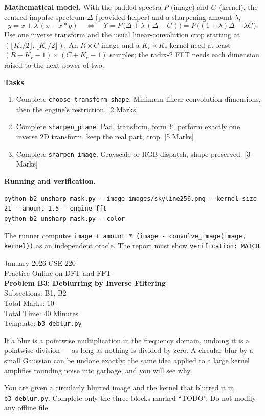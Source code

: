 \documentclass[11pt]{article}
\newcommand{\file}[1]{\texttt{#1}}
\newcommand{\code}[1]{\texttt{#1}}
\newcommand{\problemheader}[3]{%
  \begin{center}
    {\large January 2026 CSE 220}\\
    {\large Practice Online on DFT and FFT}\\[2pt]
    {\Large\bfseries #1}\\[2pt]
    Subsections: #2\\
    Total Marks: 10\\
    Total Time: 40 Minutes\\[2pt]
    {\small Template: \file{#3}}
  \end{center}
  \vspace{4pt}
}
\begin{document}
\textbf{Mathematical model.} With the padded spectra $P$ (image) and $G$
(kernel), the centred impulse spectrum $\Delta$ (provided helper) and a
sharpening amount $\lambda$,
\[
  y = x + \lambda\,(x - x * g)
  \quad\Longleftrightarrow\quad
  Y = P\,\big(\Delta + \lambda\,(\Delta - G)\big) = P\,\big((1+\lambda)\Delta - \lambda G\big).
\]
Use one inverse transform and the usual linear-convolution crop starting at
$(\lfloor K_r/2 \rfloor, \lfloor K_c/2 \rfloor)$. An $R \times C$ image and a
$K_r \times K_c$ kernel need at least $(R + K_r - 1) \times (C + K_c - 1)$
samples; the radix-2 FFT needs each dimension raised to the next power of two.

\textbf{Tasks}
\begin{enumerate}[nosep]
  \item Complete \code{choose\_transform\_shape}. Minimum linear-convolution
        dimensions, then the engine's restriction.
        \hfill [2 Marks]
  \item Complete \code{sharpen\_plane}. Pad, transform, form $Y$, perform
        exactly one inverse 2D transform, keep the real part, crop.
        \hfill [5 Marks]
  \item Complete \code{sharpen\_image}. Grayscale or RGB dispatch, shape
        preserved.
        \hfill [3 Marks]
\end{enumerate}

\textbf{Running and verification.}
\begin{lstlisting}
python b2_unsharp_mask.py --image images/skyline256.png --kernel-size 21 --amount 1.5 --engine fft
python b2_unsharp_mask.py --color
\end{lstlisting}
The runner computes \code{image + amount * (image - convolve\_image(image, kernel))}
as an independent oracle. The report must show \code{verification: MATCH}.

\newpage
\problemheader{Problem B3: Deblurring by Inverse Filtering}{B1, B2}{b3\_deblur.py}

If a blur is a pointwise multiplication in the frequency domain, undoing it is
a pointwise division --- as long as nothing is divided by zero. A circular blur
by a small Gaussian can be undone exactly; the same idea applied to a large
kernel amplifies rounding noise into garbage, and you will see why.

You are given a circularly blurred image and the kernel that blurred it in
\file{b3\_deblur.py}. Complete only the three blocks marked ``TODO''. Do not
modify any offline file.
\end{document}
